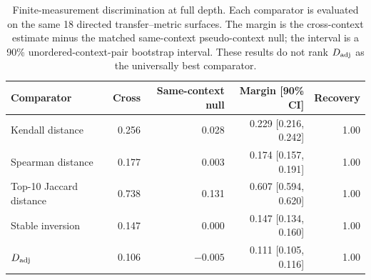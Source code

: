 \begin{table}[H]
\centering
\caption{Finite-measurement discrimination at full depth. Each comparator is
evaluated on the same 18 directed transfer--metric surfaces. The margin is the
cross-context estimate minus the matched same-context pseudo-context null; the
interval is a 90\% unordered-context-pair bootstrap interval. These results do
not rank $D_{\rm adj}$ as the universally best comparator.}
\label{tab:finite-measurement}
\small
\begin{tabular}{lrrrr}
\toprule
Comparator & Cross & Same-context null & Margin [90\% CI] & Recovery \\
\midrule
Kendall distance & 0.256 & 0.028 & 0.229 [0.216, 0.242] & 1.00 \\
Spearman distance & 0.177 & 0.003 & 0.174 [0.157, 0.191] & 1.00 \\
Top-10 Jaccard distance & 0.738 & 0.131 & 0.607 [0.594, 0.620] & 1.00 \\
Stable inversion & 0.147 & 0.000 & 0.147 [0.134, 0.160] & 1.00 \\
$D_{\rm adj}$ & 0.106 & $-0.005$ & 0.111 [0.105, 0.116] & 1.00 \\
\bottomrule
\end{tabular}
\end{table}
